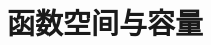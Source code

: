 \documentclass[../main.tex]{subfiles}
\begin{document}
\chapter{函数空间与容量}\label{chapter:ch03}





\end{document}
